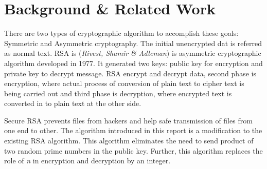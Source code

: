 \documentclass[conference]{IEEEtran}
\begin{document}
\section{{\LARGE Background \& Related Work}}
There are two types of cryptographic algorithm to accomplish these goals: Symmetric and Asymmetric cryptography. The initial unencrypted dat is referred as normal text. RSA is (\emph{Rivest, Shamir \& Adleman}) is asymmetric cryptographic algorithm developed in 1977. It generated two keys: public key for encryption and private key to decrypt message. RSA encrypt and decrypt data, second phase is encryption, where actual process of conversion of plain text to cipher text is being carried out and third phase is decryption, where encrypted text is converted in to plain text at the other side.


Secure RSA prevents files from hackers and help safe transmission of files from one end to other\cite{6021216}. The algorithm introduced in this report is a modification to the existing RSA algorithm. This algorithm eliminates the need to send product of two random prime numbers in the public key. Further, this algorithm replaces the role of \emph{n} in encryption and decryption by an integer.



\end{document}
